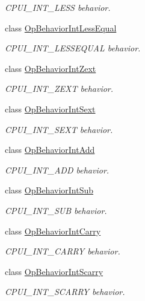 \begin{DoxyCompactItemize}
\begin{DoxyCompactList}\small\item\em C\+P\+U\+I\+\_\+\+I\+N\+T\+\_\+\+L\+E\+SS behavior. \end{DoxyCompactList}\item 
class \mbox{\hyperlink{class_op_behavior_int_less_equal}{Op\+Behavior\+Int\+Less\+Equal}}
\begin{DoxyCompactList}\small\item\em C\+P\+U\+I\+\_\+\+I\+N\+T\+\_\+\+L\+E\+S\+S\+E\+Q\+U\+AL behavior. \end{DoxyCompactList}\item 
class \mbox{\hyperlink{class_op_behavior_int_zext}{Op\+Behavior\+Int\+Zext}}
\begin{DoxyCompactList}\small\item\em C\+P\+U\+I\+\_\+\+I\+N\+T\+\_\+\+Z\+E\+XT behavior. \end{DoxyCompactList}\item 
class \mbox{\hyperlink{class_op_behavior_int_sext}{Op\+Behavior\+Int\+Sext}}
\begin{DoxyCompactList}\small\item\em C\+P\+U\+I\+\_\+\+I\+N\+T\+\_\+\+S\+E\+XT behavior. \end{DoxyCompactList}\item 
class \mbox{\hyperlink{class_op_behavior_int_add}{Op\+Behavior\+Int\+Add}}
\begin{DoxyCompactList}\small\item\em C\+P\+U\+I\+\_\+\+I\+N\+T\+\_\+\+A\+DD behavior. \end{DoxyCompactList}\item 
class \mbox{\hyperlink{class_op_behavior_int_sub}{Op\+Behavior\+Int\+Sub}}
\begin{DoxyCompactList}\small\item\em C\+P\+U\+I\+\_\+\+I\+N\+T\+\_\+\+S\+UB behavior. \end{DoxyCompactList}\item 
class \mbox{\hyperlink{class_op_behavior_int_carry}{Op\+Behavior\+Int\+Carry}}
\begin{DoxyCompactList}\small\item\em C\+P\+U\+I\+\_\+\+I\+N\+T\+\_\+\+C\+A\+R\+RY behavior. \end{DoxyCompactList}\item 
class \mbox{\hyperlink{class_op_behavior_int_scarry}{Op\+Behavior\+Int\+Scarry}}
\begin{DoxyCompactList}\small\item\em C\+P\+U\+I\+\_\+\+I\+N\+T\+\_\+\+S\+C\+A\+R\+RY behavior. \end{DoxyCompactList}\item 

\end{DoxyCompactItemize}

